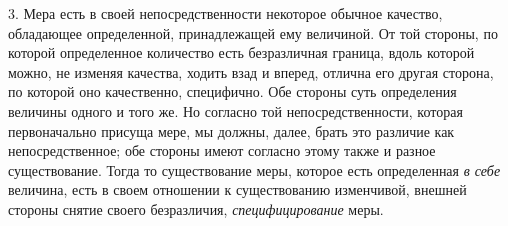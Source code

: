 3. Мера есть в своей непосредственности некоторое обычное качество,
обладающее определенной, принадлежащей ему величиной. От той стороны, по
которой определенное количество есть безразличная граница, вдоль которой
можно, не изменяя качества, ходить взад и вперед, отлична его другая
сторона, по которой оно качественно, специфично. Обе стороны суть
определения величины одного и того же. Но согласно той непосредственности,
которая первоначально присуща мере, мы должны, далее, брать это различие
как непосредственное; обе стороны имеют согласно этому также и разное
существование. Тогда то существование меры, которое есть определенная
{\em в себе} величина, есть в своем отношении к
существованию изменчивой, внешней стороны снятие своего безразличия,
{\em специфицирование} меры.
